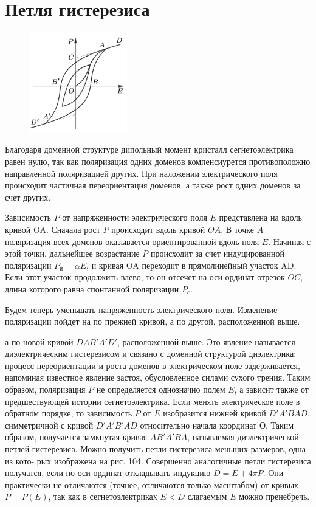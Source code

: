 \documentclass[12pt]{article}
\begin{document}
\section{Петля гистерезиса}
\begin{figure}
    \centering
    \includegraphics[width=0.38\textwidth]{gist.png}
\end{figure}
Благодаря доменной структуре дипольный момент кристалл сегнетоэлектрика равен нулю, так как поляризация одних доменов компенсиурется противоположно направленной поляризацией других. 
При наложении электрического поля происходит частичная переориентация доменов, а также рост одних доменов за счет других. 

Зависимость $P$ от напряженности электрического поля $E$ представлена на вдоль кривой OA. Сначала рост $P$ происходит вдоль кривой $OA$. В точке $A$ поляризация всех доменов оказывается ориентированной вдоль поля $E$. Начиная с этой точки, дальнейшее возрастание $P$ происходит за счет индуцированной поляризации $P_\text{и} = \alpha E$, и кривая OA переходит в прямолинейный участок AD. Если этот участок продолжить влево, то он отсечет на оси ординат отрезок $OC$, длина которого равна спонтанной поляризации $P_c$.

Будем теперь уменьшать напряженность электрического поля. Изменение поляризации пойдет на по прежней кривой, а по другой, расположенной выше. 

а по новой кривой $DAB'A'D'$, расположенной выше. Это явление называется диэлектрическим гистерезисом и связано с доменной структурой диэлектрика: процесс переориентации и роста доменов в электрическом поле задерживается, напоминая известное явление застоя,
обусловленное силами сухого трения. Таким образом, поляризация $P$ не определяется однозначно полем $E$, а зависит также
от предшествующей истории сегнетоэлектрика. Если менять электрическое поле в обратном порядке, то зависимость $P$ от $E$ изобразится нижней кривой $D'A'BAD$, симметричной с кривой $D'A'B'AD$ относительно начала координат О. Таким образом, получается замкнутая кривая $AB'A'BA$, называемая диэлектрической петлей гистерезиса. Можно получить петли гистерезиса меньших размеров, одна из кото- рых изображена на рис. 104. Совершенно аналогичные петли гистерезиса получатся, если по оси ординат откладывать индукцию $D = E + 4\pi P$. Они практически не отличаются (точнее, отличаются только масштабом) от кривых $P = P(E)$, так как в сегнетоэлектриках  $E < D$ слагаемым $E$ можно пренебречь.
\end{document}
